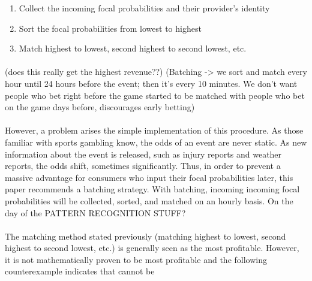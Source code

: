\documentclass[12pt,letterpaper]{article}
\begin{document}
\begin{enumerate}
\item Collect the incoming focal probabilities and their provider’s identity

\item Sort the focal probabilities from lowest to highest

\item Match highest to lowest, second highest to second lowest, etc.
\end{enumerate}

\paragraph{} (does this really get the highest revenue??)
(Batching -> we sort and match every hour until 24 hours before the event; then it’s every 10 minutes. We don’t want people who bet right before the game started to be matched with people who bet on the game days before, discourages early betting)

\paragraph{} However, a problem arises the simple implementation of this procedure. As those familiar with sports gambling know, the odds of an event are never static. As new information about the event is released, such as injury reports and weather reports, the odds shift, sometimes significantly. Thus, in order to prevent a massive advantage for consumers who input their focal probabilities later, this paper recommends a batching strategy. With batching, incoming incoming focal probabilities will be collected, sorted, and matched on an hourly basis. On the day of the PATTERN RECOGNITION STUFF?

\paragraph{} The matching method stated previously (matching highest to lowest, second highest to second lowest, etc.) is generally seen as the most profitable. However, it is not mathematically proven to be most profitable and the following counterexample indicates that cannot be
\end{document}
